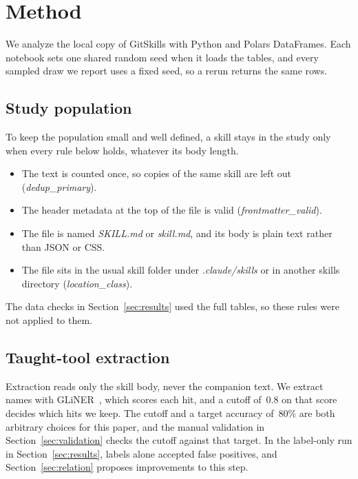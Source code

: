 \section{Method}
\label{sec:method}

We analyze the local copy of GitSkills with Python and Polars DataFrames.
Each notebook sets one shared random seed when it loads the tables, and every sampled draw we report uses a fixed seed, so a rerun returns the same rows.

\subsection{Study population}
\label{sec:population}

To keep the population small and well defined, a skill stays in the study only when every rule below holds, whatever its body length.

\begin{itemize}
  \item The text is counted once, so copies of the same skill are left out (\textit{dedup\_primary}).
  \item The header metadata at the top of the file is valid (\textit{frontmatter\_valid}).
  \item The file is named \textit{SKILL.md} or \textit{skill.md}, and its body is plain text rather than JSON or CSS.
  \item The file sits in the usual skill folder under \textit{.claude/skills} or in another skills directory (\textit{location\_class}).
\end{itemize}

The data checks in Section~\ref{sec:results} used the full tables, so these rules were not applied to them.

\subsection{Taught-tool extraction}
\label{sec:extraction}

Extraction reads only the skill body, never the companion text.
We extract names with GLiNER~\cite{zaratiana2023glinergeneralistmodelnamed}, which scores each hit, and a cutoff of~$0.8$ on that score decides which hits we keep.
The cutoff and a target accuracy of~$80\%$ are both arbitrary choices for this paper, and the manual validation in Section~\ref{sec:validation} checks the cutoff against that target.
In the label-only run in Section~\ref{sec:results}, labels alone accepted false positives, and Section~\ref{sec:relation} proposes improvements to this step.


